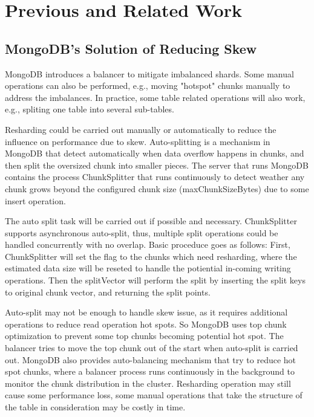 \documentclass[a4paper,10pt,twoside]{article}
\begin{document}
\section{Previous and Related Work}
\label{Relabted}

\subsection{MongoDB's Solution of Reducing Skew}

MongoDB introduces a balancer to mitigate imbalanced shards\cite{MongoDB_balancing1}.
Some manual operations can also be performed, e.g., moving "hotspot" chunks manually to address the imbalances. 
In practice, some table related operations will also work, e.g., spliting one table into several sub-tables.
\par
Resharding could be carried out manually or automatically to reduce the influence on performance due to skew.
Auto-splitting is a mechanism in MongoDB\cite{MongoDB_sharding1} that detect automatically when data overflow happens in chunks, 
and then split the oversized chunk into smaller pieces.
The server that runs MongoDB contains the process ChunkSplitter that runs continuously to detect weather any chunk grows beyond the configured chunk size (maxChunkSizeBytes) due to some insert operation.
\par
The auto split task will be carried out if possible and necessary. ChunkSplitter supports asynchronous auto-split, thus, 
multiple split operations could be handled concurrently with no overlap. 
Basic proceduce goes as follows: 
First, ChunkSplitter will set the flag to the chunks which need resharding, where the estimated data size will be reseted to handle the potiential in-coming writing operations.
Then the splitVector will perform the split by inserting the split keys to original chunk vector, and returning the split points.
\par
Auto-split may not be enough to handle skew issue, as it requires additional operations to reduce read operation hot spots.
So MongoDB uses top chunk optimization to prevent some top chunks becoming potential hot spot.
The balancer tries to move the top chunk out of the start when auto-split is carried out.
MongoDB also provides auto-balancing mechanism that try to reduce hot spot chunks, where a balancer process runs continuously in the background to monitor the chunk distribution in the cluster.
Resharding operation may still cause some performance loss, some manual operations that take the structure of the table in consideration may be costly in time.
\end{document}
